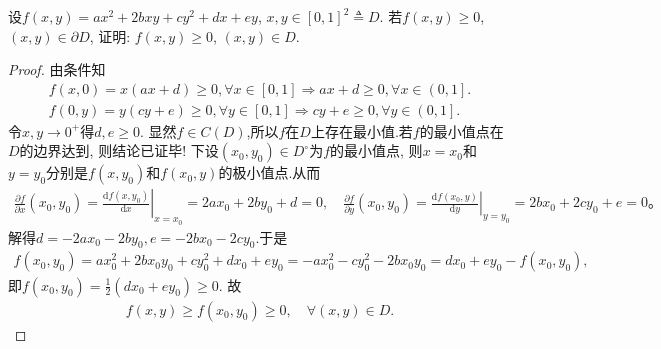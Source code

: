 \documentclass[../../main.tex]{subfiles}%
\begin{document}
\begin{example}
设$f(x,y)=ax^2+2bxy+cy^2+dx+ey$, $x,y\in[0,1]^2\triangleq D$. 若$f(x,y)\geqslant0$, $(x,y)\in\partial D$, 证明: $f(x,y)\geqslant0$, $(x,y)\in D$.
\end{example}
\begin{proof}
由条件知
\begin{gather*}
f\left( x,0 \right) =x\left( ax+d \right) \geqslant 0,\forall x\in \left[ 0,1 \right] \Longrightarrow ax+d\geqslant 0,\forall x\in \left( 0,1 \right] .
\\
f\left( 0,y \right) =y\left( cy+e \right) \geqslant 0,\forall y\in \left[ 0,1 \right] \Longrightarrow cy+e\geqslant 0,\forall y\in \left( 0,1 \right] .
\end{gather*}
令$x,y\rightarrow 0^+$得$d,e\geqslant 0$. 显然$f\in C(D)$,所以$f$在$D$上存在最小值.若$f$的最小值点在$D$的边界达到, 则结论已证毕! 下设$(x_0,y_0)\in D^\circ$为$f$的最小值点, 则$x=x_0$和$y=y_0$分别是$f(x,y_0)$和$f(x_0,y)$的极小值点.从而
\begin{align*}
\frac{\partial f}{\partial x}\left( x_0,y_0 \right) =\left.\frac{\mathrm{d}f\left( x,y_0 \right)}{\mathrm{d}x}\right|_{x=x_0}=2ax_0+2by_0+d=0,\quad \frac{\partial f}{\partial y}\left( x_0,y_0 \right) =\left.\frac{\mathrm{d}f\left( x_0,y \right)}{\mathrm{d}y}\right|_{y=y_0}=2bx_0+2cy_0+e=0。
\end{align*}
解得$d=-2ax_0-2by_0,e=-2bx_0-2cy_0$.于是
\begin{align*}
f(x_0,y_0)=ax_0^2+2bx_0y_0+cy_0^2+dx_0+ey_0=-ax_0^2-cy_0^2-2bx_0y_0=dx_0+ey_0-f(x_0,y_0),
\end{align*}
即$f(x_0,y_0)=\frac{1}{2}(dx_0+ey_0)\geqslant0$. 故
\begin{align*}
f(x,y)\geqslant f(x_0,y_0)\geqslant 0,\quad \forall (x,y)\in D.
\end{align*}
\end{proof}
\end{document}

